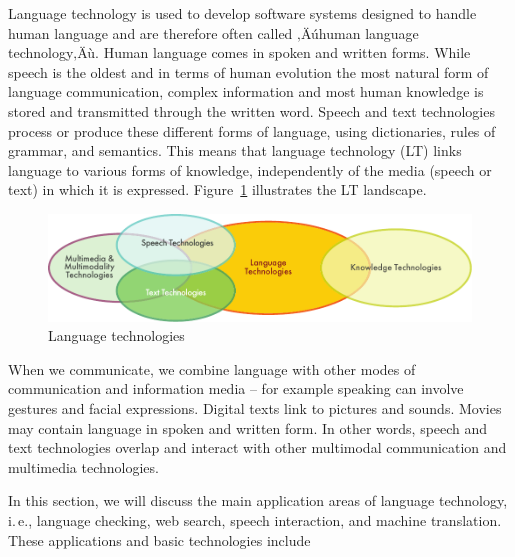 \clearpage


\begin{multicols}{2}

  Language technology is used to develop software systems designed to
  handle human language and are therefore often called ‚Äúhuman language
  technology‚Äù. Human language comes in spoken and written forms. While
  speech is the oldest and in terms of human evolution the most
  natural form of language communication, complex information and most
  human knowledge is stored and transmitted through the written
  word. Speech and text technologies process or produce these
  different forms of language, using dictionaries, rules of grammar,
  and semantics. This means that language technology (LT) links
  language to various forms of knowledge, independently of the media
  (speech or text) in which it is
  expressed. Figure~\ref{fig:ltincontext_en} illustrates the LT
  landscape.

\begin{figure}[htb]
  \center
  \includegraphics[width=\textwidth]{../_media/english/language_technologies}
  \caption{Language technologies}
  \label{fig:ltincontext_en}
\end{figure}

When we communicate, we combine language with other modes of communication and
information media -- for example speaking can involve gestures and facial
expressions. Digital texts link to pictures and sounds. Movies may contain
language in spoken and written form. In other words, speech and text
technologies overlap and interact with other multimodal communication and
multimedia technologies.

In this section, we will discuss the main application areas of language
technology, i.\,e., language checking, web search, speech interaction, and
machine translation. These applications and basic technologies include 


\end{multicols}
